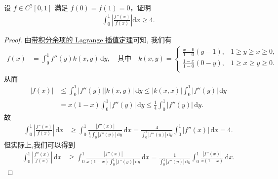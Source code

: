 \documentclass[../../main.tex]{subfiles}
\begin{document}
\begin{example}
设 $f \in C^2[0,1]$ 满足 $f(0) = f(1) = 0$，证明
\begin{align*}
\int_{0}^{1} \left| \frac{f''(x)}{f(x)} \right| \mathrm{d}x \geqslant  4.
\end{align*}
\end{example}
\begin{proof}
由\hyperref[theorem:带积分型余项的Lagrange插值公式]{带积分余项的 Lagrange 插值定理}可知, 我们有
\begin{align*}
f(x) &= \int_0^1 f''(y) k(x,y) \, \mathrm{d}y, \quad \text{其中} \quad k(x,y) = 
\begin{cases}
\frac{x-0}{1-0}(y-1),&		1\ge y\ge x\ge 0,\\
\frac{1-x}{1-0}(0-y),&		1\ge x\ge y\ge 0.\\
\end{cases}
\end{align*}
从而
\begin{align*}
|f(x)| &\leqslant \int_0^1 |f''(y)| |k(x,y)| \, \mathrm{d}y \leqslant |k(x,x)| \int_0^1 |f''(y)| \, \mathrm{d}y \\
&= x(1-x) \int_0^1 |f''(y)| \, \mathrm{d}y \leqslant \frac{1}{4} \int_0^1 |f''(y)| \, \mathrm{d}y.
\end{align*}
故
\begin{align*}
\int_0^1 \left| \frac{f''(x)}{f(x)} \right| \, \mathrm{d}x &\geqslant \int_0^1 \frac{|f''(x)|}{\frac{1}{4} \int_0^1 |f''(y)| \, \mathrm{d}y} \, \mathrm{d}x = \frac{4}{\int_0^1 |f''(y)| \, \mathrm{d}y} \int_0^1 |f''(x)| \, \mathrm{d}x = 4.
\end{align*}
但实际上,我们可以得到
\begin{align*}
\int_0^1 \left| \frac{f''(x)}{f(x)} \right| \, \mathrm{d}x &\geqslant \int_0^1 \frac{|f''(x)|}{x(1-x) \int_0^1 |f''(y)| \, \mathrm{d}y} \, \mathrm{d}x = \frac{1}{\int_0^1 |f''(y)| \, \mathrm{d}y} \int_0^1 \frac{|f''(x)|}{x(1-x)} \, \mathrm{d}x.
\end{align*}
\end{proof}
\end{document}
